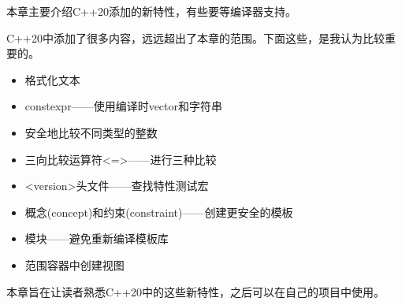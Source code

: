 
本章主要介绍C++20添加的新特性，有些要等编译器支持。

C++20中添加了很多内容，远远超出了本章的范围。下面这些，是我认为比较重要的。

\begin{itemize}
\item 
格式化文本

\item 
constexpr——使用编译时vector和字符串

\item 
安全地比较不同类型的整数

\item 
三向比较运算符<=>——进行三种比较

\item 
<version>头文件——查找特性测试宏

\item 
概念(concept)和约束(constraint)——创建更安全的模板

\item 
模块——避免重新编译模板库

\item 
范围容器中创建视图
\end{itemize}

本章旨在让读者熟悉C++20中的这些新特性，之后可以在自己的项目中使用。



